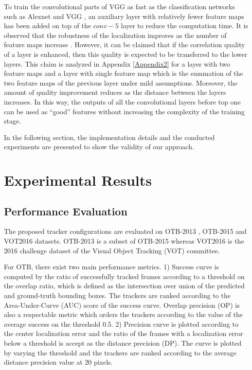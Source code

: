 \documentclass[journal]{IEEEtran}
\begin{document}
To train the convolutional parts of VGG as fast as the classification networks such as Alexnet \cite{ImageNetCNN} and VGG \cite{VGG}, an auxiliary layer with relatively fewer feature maps has been added on top of the $conv-5$ layer to reduce the computation time. It is observed that the robustness of the localization improves as the number of feature maps increase \cite{CCOT,deepSRDCF}. However, it can be claimed that if the correlation quality of a layer is enhanced, then this quality is expected to be transferred to the lower layers. This claim is analyzed in Appendix \ref{Appendix2} for a layer with two feature maps and a layer with single feature map which is the summation of the two feature maps of the previous layer under mild assumptions. Moreover, the amount of quality improvement reduces as the distance between the layers increases. In this way, the outputs of all the convolutional layers before top one can be used as ``good'' features without increasing the complexity of the training stage.

In the following section, the implementation details and the conducted experiments are presented to show the validity of our approach.
\section{Experimental Results}
\label{secExperiments}
\subsection{Performance Evaluation}
The proposed tracker configurations are evaluated on OTB-2013 \cite{Benchmark2013}, OTB-2015 \cite{BenchmarkPAMI} and VOT2016 \cite{VOT2016} datasets. OTB-2013 is a subset of OTB-2015 whereas VOT2016 is the 2016 challenge dataset of the Visual Object Tracking (VOT) committee.

For OTB, there exist two main performance metrics. 1) Success curve is computed by the ratio of successfully tracked frames according to a threshold on the overlap ratio, which is defined as the intersection over union of the predicted and ground-truth bounding boxes. The trackers are ranked according to the Area-Under-Curve (AUC) score of the success curve. Overlap precision (OP) is also a respectable metric which orders the trackers according to the value of the average success on the threshold $0.5$. 2) Precision curve is plotted according to the center localization error and the ratio of the frames with a localization error below a threshold is accept as the distance precision (DP). The curve is plotted by varying the threshold and the trackers are ranked according to the average distance precision value at $20$ pixels.
\end{document}
